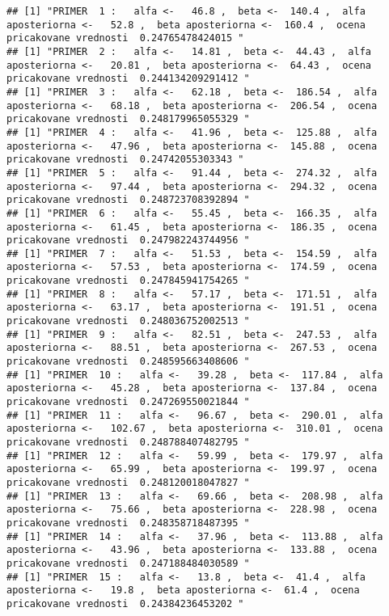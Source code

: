 \documentclass[
]{article}
\begin{document}
\begin{verbatim}
## [1] "PRIMER  1 :   alfa <-   46.8 ,  beta <-  140.4 ,  alfa aposteriorna <-   52.8 ,  beta aposteriorna <-  160.4 ,  ocena pricakovane vrednosti  0.24765478424015 "
## [1] "PRIMER  2 :   alfa <-   14.81 ,  beta <-  44.43 ,  alfa aposteriorna <-   20.81 ,  beta aposteriorna <-  64.43 ,  ocena pricakovane vrednosti  0.244134209291412 "
## [1] "PRIMER  3 :   alfa <-   62.18 ,  beta <-  186.54 ,  alfa aposteriorna <-   68.18 ,  beta aposteriorna <-  206.54 ,  ocena pricakovane vrednosti  0.248179965055329 "
## [1] "PRIMER  4 :   alfa <-   41.96 ,  beta <-  125.88 ,  alfa aposteriorna <-   47.96 ,  beta aposteriorna <-  145.88 ,  ocena pricakovane vrednosti  0.24742055303343 "
## [1] "PRIMER  5 :   alfa <-   91.44 ,  beta <-  274.32 ,  alfa aposteriorna <-   97.44 ,  beta aposteriorna <-  294.32 ,  ocena pricakovane vrednosti  0.248723708392894 "
## [1] "PRIMER  6 :   alfa <-   55.45 ,  beta <-  166.35 ,  alfa aposteriorna <-   61.45 ,  beta aposteriorna <-  186.35 ,  ocena pricakovane vrednosti  0.247982243744956 "
## [1] "PRIMER  7 :   alfa <-   51.53 ,  beta <-  154.59 ,  alfa aposteriorna <-   57.53 ,  beta aposteriorna <-  174.59 ,  ocena pricakovane vrednosti  0.247845941754265 "
## [1] "PRIMER  8 :   alfa <-   57.17 ,  beta <-  171.51 ,  alfa aposteriorna <-   63.17 ,  beta aposteriorna <-  191.51 ,  ocena pricakovane vrednosti  0.248036752002513 "
## [1] "PRIMER  9 :   alfa <-   82.51 ,  beta <-  247.53 ,  alfa aposteriorna <-   88.51 ,  beta aposteriorna <-  267.53 ,  ocena pricakovane vrednosti  0.248595663408606 "
## [1] "PRIMER  10 :   alfa <-   39.28 ,  beta <-  117.84 ,  alfa aposteriorna <-   45.28 ,  beta aposteriorna <-  137.84 ,  ocena pricakovane vrednosti  0.247269550021844 "
## [1] "PRIMER  11 :   alfa <-   96.67 ,  beta <-  290.01 ,  alfa aposteriorna <-   102.67 ,  beta aposteriorna <-  310.01 ,  ocena pricakovane vrednosti  0.248788407482795 "
## [1] "PRIMER  12 :   alfa <-   59.99 ,  beta <-  179.97 ,  alfa aposteriorna <-   65.99 ,  beta aposteriorna <-  199.97 ,  ocena pricakovane vrednosti  0.248120018047827 "
## [1] "PRIMER  13 :   alfa <-   69.66 ,  beta <-  208.98 ,  alfa aposteriorna <-   75.66 ,  beta aposteriorna <-  228.98 ,  ocena pricakovane vrednosti  0.248358718487395 "
## [1] "PRIMER  14 :   alfa <-   37.96 ,  beta <-  113.88 ,  alfa aposteriorna <-   43.96 ,  beta aposteriorna <-  133.88 ,  ocena pricakovane vrednosti  0.247188484030589 "
## [1] "PRIMER  15 :   alfa <-   13.8 ,  beta <-  41.4 ,  alfa aposteriorna <-   19.8 ,  beta aposteriorna <-  61.4 ,  ocena pricakovane vrednosti  0.24384236453202 "

\end{verbatim}
\end{document}
